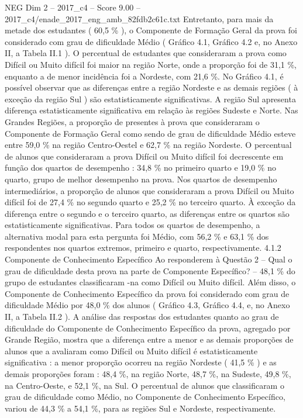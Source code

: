 \begin{textsample}{NEG Dim 2 – 2017\_c4 – Score 9.00 – 2017\_c4/enade\_2017\_eng\_amb\_82fdb2c61c.txt}
Entretanto, para mais da metade dos estudantes ( 60,5 \% ), o Componente de Formação Geral da prova foi considerado com grau de dificuldade Médio ( Gráfico 4.1, Gráfico 4.2 e, no Anexo II, a Tabela II.1 ).
O percentual de estudantes que consideraram a prova como Difícil ou Muito difícil foi maior na região Norte, onde a proporção foi de 31,1 \%, enquanto a de menor incidência foi a Nordeste, com 21,6 \%.
No Gráfico 4.1, é possível observar que as diferenças entre a região Nordeste e as demais regiões ( à exceção da região Sul ) são estatisticamente significativas.
A região Sul apresenta diferença estatisticamente significativa em relação às regiões Sudeste e Norte.
Nas Grandes Regiões, a proporção de presentes à prova que consideraram o Componente de Formação Geral como sendo de grau de dificuldade Médio esteve entre 59,0 \% na região Centro-Oestel e 62,7 \% na região Nordeste.
O percentual de alunos que consideraram a prova Difícil ou Muito difícil foi decrescente em função dos quartos de desempenho : 34,8 \% no primeiro quarto e 19,0 \% no quarto, grupo de melhor desempenho na prova.
Nos quartos de desempenho intermediários, a proporção de alunos que consideraram a prova Difícil ou Muito difícil foi de 27,4 \% no segundo quarto e 25,2 \% no terceiro quarto.
À exceção da diferença entre o segundo e o terceiro quarto, as diferenças entre os quartos são estatisticamente significativas.
Para todos os quartos de desempenho, a alternativa modal para esta pergunta foi Médio, com 56,2 \% e 63,1 \% dos respondentes nos quartos extremos, primeiro e quarto, respectivamente. 4.1.2 Componente de Conhecimento Específico Ao responderem à Questão 2 – Qual o grau de dificuldade desta prova na parte de Componente Específico? – 48,1 \% do grupo de estudantes classificaram -na como Difícil ou Muito difícil.
Além disso, o Componente de Conhecimento Específico da prova foi considerado com grau de dificuldade Médio por 48,0 \% dos alunos ( Gráfico 4.3, Gráfico 4.4, e, no Anexo II, a Tabela II.2 ).
A análise das respostas dos estudantes quanto ao grau de dificuldade do Componente de Conhecimento Específico da prova, agregado por Grande Região, mostra que a diferença entre a menor e as demais proporções de alunos que a avaliaram como Difícil ou Muito difícil é estatisticamente significativa : a menor proporção ocorreu na região Nordeste ( 41,5 \% ) e as demais proporções foram : 48,4 \%, na região Norte, 48,7 \%, na Sudeste, 49,8 \%, na Centro-Oeste, e 52,1 \%, na Sul.
O percentual de alunos que classificaram o grau de dificuldade como Médio, no Componente de Conhecimento Específico, variou de 44,3 \% a 54,1 \%, para as regiões Sul e Nordeste, respectivamente.

\end{textsample}

